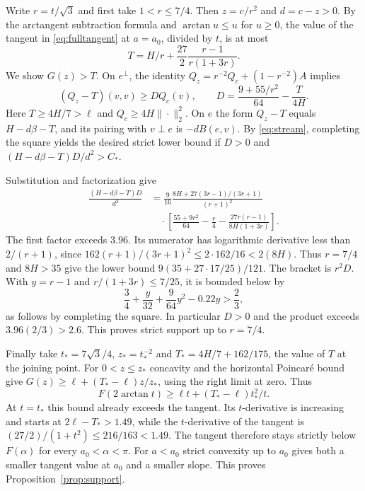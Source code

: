 \documentclass[11pt,a4paper,reqno]{amsart}
\theoremstyle{remark}
\numberwithin{equation}{section}
\begin{document}
Write $r=t/\sqrt3$ and first take $1<r\le7/4$. Then $z=c/r^2$ and
$d=c-z>0$. By the arctangent subtraction formula and $\arctan u\le u$ for
$u\ge0$, the value of the tangent in \eqref{eq:fulltangent} at $a=a_0$,
divided by $t$, is at most
\[
 T=H/r+\frac{27}{2}\frac{r-1}{r(1+3r)} .
\]
We show $G(z)>T$. On $e^\perp$, the identity
$Q_z=r^{-2}Q_c+(1-r^{-2})A$ implies
\[
 (Q_z-T)(v,v)\ge D Q_c(v),\qquad
 D=\frac{9+55/r^2}{64}-\frac{T}{4H}.
\]
Here $T\ge4H/7>\ell$ and $Q_c\ge4H\|\cdot\|_2^2$. On $e$ the form
$Q_z-T$ equals $H-d\beta-T$, and its pairing with $v\perp e$ is
$-dB(e,v)$. By \eqref{eq:stream}, completing the square yields the desired
strict lower bound if $D>0$ and $(H-d\beta-T)D/d^2>C_*$.

Substitution and factorization give
\begin{align*}
 \frac{(H-d\beta-T)D}{d^2}
  &=\frac9{16}\frac{8H+27(3r-1)/(3r+1)}{(r+1)^2}\\
  &\quad\cdot
 \left[\frac{55+9r^2}{64}-\frac r4-\frac{27r(r-1)}{8H(1+3r)}\right].
\end{align*}
The first factor exceeds $3.96$. Its numerator has logarithmic derivative
less than $2/(r+1)$, since $162(r+1)/(3r+1)^2\le2\cdot162/16<2(8H)$.
Thus $r=7/4$ and $8H>35$ give the lower bound
$9(35+27\cdot17/25)/121$. The bracket is $r^2D$. With $y=r-1$ and
$r/(1+3r)\le7/25$, it is bounded below by
\[
  \frac34+\frac y{32}+\frac9{64}y^2-0.22y>\frac23,
\]
as follows by completing the square. In particular $D>0$ and the product
exceeds $3.96(2/3)>2.6$. This proves strict support up to $r=7/4$.

Finally take $t_*=7\sqrt3/4$, $z_*=t_*^{-2}$ and
$T_*=4H/7+162/175$, the value of $T$ at the joining point. For $0<z\le z_*$
concavity and the horizontal Poincar\'e bound give
$G(z)\ge\ell+(T_*-\ell)z/z_*$, using the right limit at zero. Thus
\[
 F(2\arctan t)\ge \ell t+(T_*-\ell)t_*^2/t .
\]
At $t=t_*$ this bound already exceeds the tangent. Its $t$-derivative is
increasing and starts at $2\ell-T_*>1.49$, while the $t$-derivative of the
tangent is $(27/2)/(1+t^2)\le216/163<1.49$. The tangent therefore stays strictly below $F(\alpha)$ for every
$a_0<\alpha<\pi$. For $a<a_0$ strict convexity up to
$a_0$ gives both a smaller tangent value at $a_0$ and a smaller slope.
This proves Proposition~\ref{prop:support}.
\end{document}
